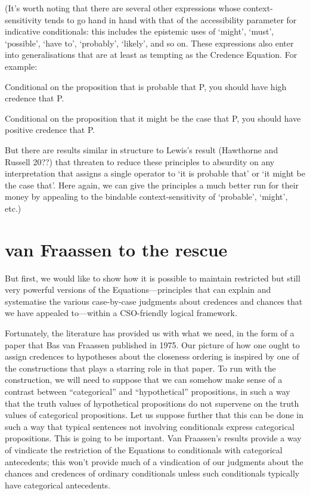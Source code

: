 \documentclass[If.tex]{subfiles}
\begin{document}
(It's worth noting that there are several other expressions whose context-sensitivity tends to go hand in hand with that of the accessibility parameter for indicative conditionals: this includes the epistemic uses of ‘might’, ‘must’, ‘possible’, ‘have to’, ‘probably’, ‘likely’, and so on. These expressions also enter into generalisations that are at least as tempting as the Credence Equation. For example:
\begin{prop}
	\item
	Conditional on the proposition that is probable that P, you should have high credence that P.
	\item
	Conditional on the proposition that it might be the case that P, you should have positive credence that P.
\end{prop}
But there are results similar in structure to Lewis's result (Hawthorne and Russell 20??) that threaten to reduce these principles to absurdity on any interpretation that assigns a single operator to ‘it is probable that’ or ‘it might be the case that’. Here again, we can give the principles a much better run for their money by appealing to the bindable context-sensitivity of ‘probable’, ‘might’, etc.)

\section{van Fraassen to the rescue}
But first, we would like to show how it is possible to maintain restricted but still very powerful versions of the Equations---principles that can explain and systematise the various case-by-case judgments about credences and chances that we have appealed to---within a CSO-friendly logical framework.

Fortunately, the literature has provided us with what we need, in the form of a paper that Bas van Fraassen published in 1975. Our picture of how one ought to assign credences to hypotheses about the closeness ordering is inspired by one of the constructions that plays a starring role in that paper. To run with the construction, we will need to suppose that we can somehow make sense of a contrast between “categorical” and “hypothetical” propositions, in such a way that the truth values of hypothetical propositions do not supervene on the truth values of categorical propositions. Let us suppose further that this can be done in such a way that typical sentences not involving conditionals express categorical propositions. This is going to be important. Van Fraassen's results provide a way of vindicate the restriction of the Equations to conditionals with categorical antecedents; this won't provide much of a vindication of our judgments about the chances and credences of ordinary conditionals unless such conditionals typically have categorical antecedents.
\end{document}
